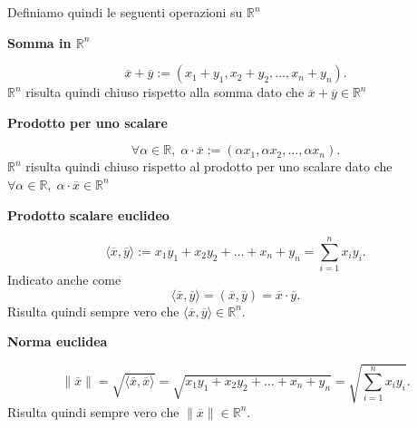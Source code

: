 Definiamo quindi le seguenti operazioni su $\mathbb{R}^n$

\begin{definition}
    \textbf{Somma in $\mathbb{R}^n$}
    
    \[ \overline{x} + \overline{y} := \left(x_1+y_1, x_2+y_2, \ldots, x_n+y_n\right). \]
    $\mathbb{R}^n$ risulta quindi chiuso rispetto alla somma dato che $\overline{x} +
    \overline{y}\in\mathbb{R}^n$
\end{definition}
\begin{definition}
    \textbf{Prodotto per uno scalare}
    
    \[ \forall \alpha\in\mathbb{R},\; \alpha\cdot\overline{x} :=\left(\alpha x_1,
    \alpha x_2, \ldots, \alpha x_n\right). \]
    $\mathbb{R}^n$ risulta quindi chiuso rispetto al prodotto per uno scalare dato che
    $\forall\alpha\in\mathbb{R}, \; \alpha\cdot\overline{x}\in\mathbb{R}^n$
\end{definition}
\begin{definition}
    \textbf{Prodotto scalare euclideo}
    
    \[
        \langle \overline{x}, \overline{y}\rangle := x_1 y_1 + x_2 y_2 + \ldots + x_n+y_n
         = \sum_{i = 1}^{n} x_i y_i.
    \]
    Indicato anche come
    \[
        \langle \overline{x}, \overline{y}\rangle = \left( \overline{x}, \overline{y} \right)
        = \overline{x}\cdot\overline{y}.
    \]
    Risulta quindi sempre vero che $\langle\overline{x},\overline{y}\rangle\in\mathbb{R}^n$.
\end{definition}
\begin{definition}
    \textbf{Norma euclidea}
    
    \[
        \|\overline{x}\| = \sqrt{\langle \overline{x}, \overline{x}\rangle} =
        \sqrt{x_1 y_1 + x_2 y_2 + \ldots + x_n+y_n} = \sqrt{\sum_{i = 1}^{n} x_i y_i}.
    \]
    Risulta quindi sempre vero che $\|\overline{x}\|\in\mathbb{R}^n$.
\end{definition}